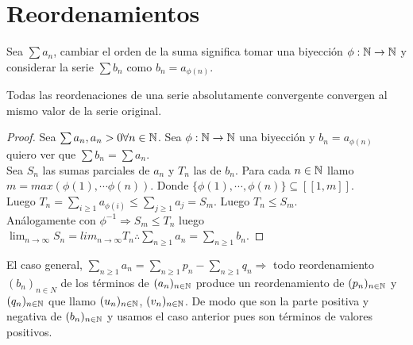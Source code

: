 \section{Reordenamientos}

\begin{definition}
  Sea $\sum a_n$, cambiar el orden de la suma significa tomar una biyección $\phi: \mathbb{N} \to \mathbb{N}$ y considerar la serie $\sum b_n$ como $b_n = a_{\phi(n)}$.
\end{definition}

\begin{theorem}
  Todas las reordenaciones de una serie absolutamente convergente convergen al mismo valor de la serie original.
  \begin{proof}
    Sea $\sum a_n, a_n > 0 \forall n \in \mathbb{N}$. Sea $\phi: \mathbb{N} \to \mathbb{N}$ una biyección y $b_n = a_{\phi(n)}$ quiero ver que $\sum b_n = \sum a_n$. \\
    Sea $S_n$ las sumas parciales de $a_n$ y $T_n$ las de $b_n$. Para cada $n \in \mathbb{N}$ llamo $m = max(\phi(1), \cdots \phi(n))$. Donde $\{ \phi(1), \cdots, \phi(n) \} \subseteq [[1, m]]$. \\
    Luego $T_n = \sum_{i \geq 1} a_{\phi(i)} \leq \sum_{j \geq 1} a_j = S_m$. Luego $T_n \leq S_m$. \\
    Análogamente con $\phi^{-1} \Rightarrow S_m \leq T_n$ luego $\lim_{n \to \infty} S_n = lim_{n \to \infty} T_n \therefore \sum_{n \geq 1} a_n = \sum_{n \geq 1} b_n$.
  \end{proof}
\end{theorem}

El caso general, $\sum_{n \geq 1} a_n = \sum_{n \geq 1} p_n - \sum_{n \geq 1} q_n \Rightarrow$ todo reordenamiento $(b_n)_{n \in N}$ de los términos de $(a_n)_{n \in \mathbb{N}}$ produce un reordenamiento de $(p_n)_{n \in \mathbb{N}}$ y $(q_n)_{n \in \mathbb{N}}$ que llamo $(u_n)_{n \in \mathbb{N}}$, $(v_n)_{n \in \mathbb{N}}$. De modo que son la parte positiva y negativa de $(b_n)_{n \in \mathbb{N}}$ y usamos el caso anterior pues son términos de valores positivos.



